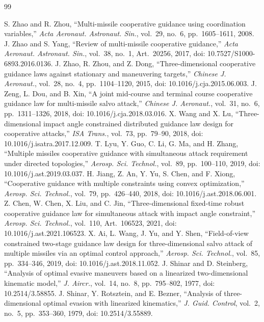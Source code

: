 \documentclass{cja}
\begin{document}
\begin{thebibliography}{99}

S. Zhao and R. Zhou, ``Multi-missile cooperative guidance using coordination variables,'' \textit{Acta Aeronaut. Astronaut. Sin.}, vol.~29, no.~6, pp.~1605--1611, 2008.
J. Zhao and S. Yang, ``Review of multi-missile cooperative guidance,'' \textit{Acta Aeronaut. Astronaut. Sin.}, vol.~38, no.~1, Art.~20256, 2017, doi: 10.7527/S1000-6893.2016.0136.
J. Zhao, R. Zhou, and Z. Dong, ``Three-dimensional cooperative guidance laws against stationary and maneuvering targets,'' \textit{Chinese J. Aeronaut.}, vol.~28, no.~4, pp.~1104--1120, 2015, doi: 10.1016/j.cja.2015.06.003.
J. Zeng, L. Dou, and B. Xin, ``A joint mid-course and terminal course cooperative guidance law for multi-missile salvo attack,'' \textit{Chinese J. Aeronaut.}, vol.~31, no.~6, pp.~1311--1326, 2018, doi: 10.1016/j.cja.2018.03.016.
X. Wang and X. Lu, ``Three-dimensional impact angle constrained distributed guidance law design for cooperative attacks,'' \textit{ISA Trans.}, vol.~73, pp.~79--90, 2018, doi: 10.1016/j.isatra.2017.12.009.
T. Lyu, Y. Guo, C. Li, G. Ma, and H. Zhang, ``Multiple missiles cooperative guidance with simultaneous attack requirement under directed topologies,'' \textit{Aerosp. Sci. Technol.}, vol.~89, pp.~100--110, 2019, doi: 10.1016/j.ast.2019.03.037.
H. Jiang, Z. An, Y. Yu, S. Chen, and F. Xiong, ``Cooperative guidance with multiple constraints using convex optimization,'' \textit{Aerosp. Sci. Technol.}, vol.~79, pp.~426--440, 2018, doi: 10.1016/j.ast.2018.06.001.
Z. Chen, W. Chen, X. Liu, and C. Jin, ``Three-dimensional fixed-time robust cooperative guidance law for simultaneous attack with impact angle constraint,'' \textit{Aerosp. Sci. Technol.}, vol.~110, Art.~106523, 2021, doi: 10.1016/j.ast.2021.106523.
X. Ai, L. Wang, J. Yu, and Y. Shen, ``Field-of-view constrained two-stage guidance law design for three-dimensional salvo attack of multiple missiles via an optimal control approach,'' \textit{Aerosp. Sci. Technol.}, vol.~85, pp.~334--346, 2019, doi: 10.1016/j.ast.2018.11.052.
J. Shinar and D. Steinberg, ``Analysis of optimal evasive maneuvers based on a linearized two-dimensional kinematic model,'' \textit{J. Aircr.}, vol.~14, no.~8, pp.~795--802, 1977, doi: 10.2514/3.58855.
J. Shinar, Y. Rotsztein, and E. Bezner, ``Analysis of three-dimensional optimal evasion with linearized kinematics,'' \textit{J. Guid. Control}, vol.~2, no.~5, pp.~353--360, 1979, doi: 10.2514/3.55889.

\end{thebibliography}
\end{document}

